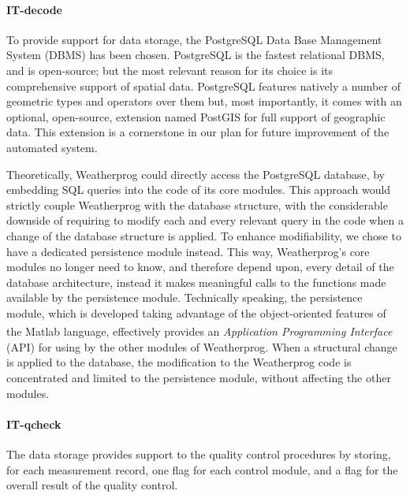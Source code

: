 \documentclass[authoryear,preprint,review,12pt]{elsarticle}
\begin{document}
\paragraph{IT-decode} To provide support for data storage, the PostgreSQL Data Base Management System (DBMS) \citep{postgres} has been chosen. PostgreSQL is the fastest relational DBMS, and is open-source; but the most relevant reason for its choice is its comprehensive support of spatial data. PostgreSQL features natively a number of geometric types and operators over them but, most importantly, it comes with an optional, open-source, extension named PostGIS for full support of geographic data. This extension is a cornerstone in our plan for future improvement of the automated system.

Theoretically, Weatherprog could directly access the PostgreSQL database, by embedding SQL queries into the code of its core modules. This approach would strictly couple Weatherprog with the database structure, with the considerable downside of requiring to modify each and every relevant query in the code when a change of the database structure is applied. To enhance modifiability, we chose to have a dedicated persistence module instead. This way, Weatherprog's core modules no longer need to know, and therefore depend upon, every detail of the database architecture, instead it makes meaningful calls to the functions made available by the persistence module. Technically speaking, the persistence module, which is developed taking advantage of the object-oriented features of the Matlab\textsuperscript{\circledR} language, effectively provides an \emph{Application Programming Interface} (API) for using by the other modules of Weatherprog. When a structural change is applied to the database, the modification to the Weatherprog code is concentrated and limited to the persistence module, without affecting the other modules.

\paragraph{IT-qcheck}\label{controlFlags}
The data storage provides support to the quality control procedures by storing, for each measurement record, one flag for each control module, and a flag for the overall result of the quality control.
\end{document}
